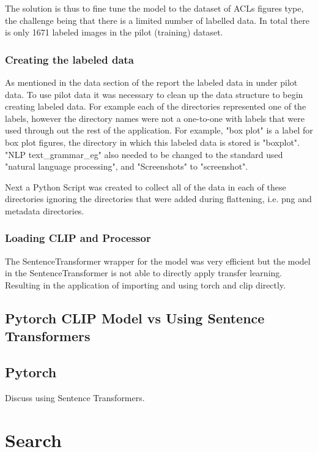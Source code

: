 \documentclass[article, 10pt]{article}
\begin{document}
The solution is thus to fine tune the model to the dataset of ACLs figures type, the
challenge being that there is a limited number of labelled data. In total there is only
1671 labeled images in the pilot (training) dataset. 

\subsubsection{Creating the labeled data}
As mentioned in the data section of the report the labeled data in under pilot data. To use pilot data it was necessary to clean up the data structure to begin creating labeled data. For example each of the directories represented one of the labels, however the directory names were not a one-to-one with labels that were used through out the rest of the application. For example, "box plot" is a label for box plot figures, the directory in which this labeled data is stored is "boxplot". "NLP text\_grammar\_eg" also needed to be changed to the standard used "natural language processing", and "Screenshots" to "screenshot".

Next a Python Script was created to collect all of the data in each of these directories ignoring the directories that were added during flattening, i.e. png and metadata directories. 



\subsubsection{Loading CLIP and Processor}
The SentenceTransformer wrapper for the model was very efficient but the model in the
SentenceTransformer is not able to directly apply transfer learning. Resulting in the 
application of importing and using torch and clip directly. 

\subsection{Pytorch CLIP Model vs Using Sentence Transformers}



\subsection{Pytorch} 
Discuss using Sentence Transformers. 


\section{Search}
\end{document}
